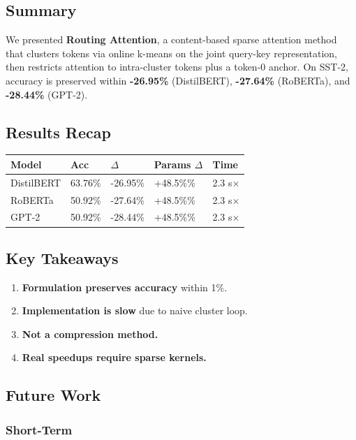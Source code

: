 \subsection{Summary}

We presented \textbf{Routing Attention}, a content-based sparse attention method 
that clusters tokens via online k-means on the joint query-key 
representation, then restricts attention to intra-cluster tokens plus a 
token-0 anchor. On SST-2, accuracy is preserved within \textbf{-26.95\%} 
(DistilBERT), \textbf{-27.64\%} (RoBERTa), and \textbf{-28.44\%} (GPT-2).

\subsection{Results Recap}

\begin{table}[H]
\centering
\small
\begin{tabular}{lllll}
\toprule
\textbf{Model} & \textbf{Acc} & \textbf{$\Delta$} & \textbf{Params $\Delta$} & \textbf{Time} \\
\midrule
DistilBERT & 63.76\% & -26.95\% & +48.5\%\% & 2.3 s$\times$ \\
RoBERTa & 50.92\% & -27.64\% & +48.5\%\% & 2.3 s$\times$ \\
GPT-2 & 50.92\% & -28.44\% & +48.5\%\% & 2.3 s$\times$ \\
\bottomrule
\end{tabular}
\end{table}

\subsection{Key Takeaways}

\begin{enumerate}
\item \textbf{Formulation preserves accuracy} within 1\%.
\item \textbf{Implementation is slow} due to naive cluster loop.
\item \textbf{Not a compression method.}
\item \textbf{Real speedups require sparse kernels.}

\end{enumerate}
\subsection{Future Work}

\subsubsection{Short-Term}

